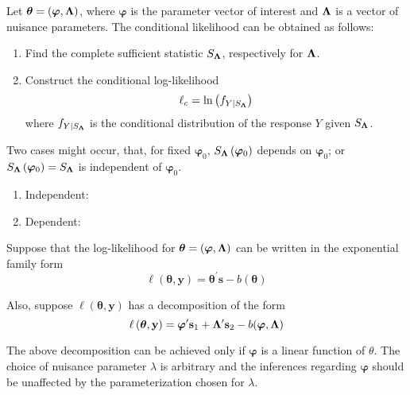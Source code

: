 Let $\boldsymbol{\theta}=(\boldsymbol{\varphi},\boldsymbol{\Lambda})$, where $\boldsymbol{\varphi}$ is the parameter vector of interest and $\boldsymbol{\Lambda}$ is a vector of nuisance parameters. The conditional likelihood can be obtained as follows:
\begin{enumerate}
	\item Find the complete sufficient statistic $S_{\boldsymbol{\Lambda}}$, respectively for $\boldsymbol{\Lambda}$.
	\item  Construct the conditional log-likelihood
	      \begin{equation}
		      \ell_{c}=\ln\left(f_{Y\mid S_{\boldsymbol{\Lambda}}}\right)
	      \end{equation}
	      where $f_{Y\mid S_{\boldsymbol{\Lambda}}}$ is the conditional distribution of the response $Y$ given $S_{\boldsymbol{\Lambda}}$.
\end{enumerate}

\begin{remark}
	Two cases might occur, that, for fixed $\boldsymbol{\varphi}_{0}$, $S_{\boldsymbol{\Lambda}}\left(\boldsymbol{\varphi}_{0}\right)$ depends on $\boldsymbol{\varphi}_{0}$; or $S_{\boldsymbol{\Lambda}}\left(\boldsymbol{\varphi}_{0}\right)=S_{\boldsymbol{\Lambda}}$ is independent of $\boldsymbol{\varphi}_{0}$.
	\begin{enumerate}
		\item Independent:
		\item Dependent:
	\end{enumerate}
\end{remark}

Suppose that the log-likelihood for $\boldsymbol{\theta}=\left(\boldsymbol{\varphi},\boldsymbol{\Lambda}\right)$ can be written in the exponential family form
\begin{equation}
	\ell\left(\boldsymbol{\theta},\mathbf{y}\right)=\boldsymbol{\theta}^{\prime}\mathbf{s}-b\left(\boldsymbol{\theta}\right)
\end{equation}

Also, suppose $\ell\left(\boldsymbol{\theta},\mathbf{y}\right)$ has a decomposition of the form
\begin{equation}
	\ell\left(\boldsymbol{\theta},\mathbf{y}\right)=\boldsymbol{\varphi}^{\prime}\mathbf{s}_{1}+\boldsymbol{\Lambda}^{\prime}\mathbf{s}_{2}-b(\boldsymbol{\varphi},\boldsymbol{\Lambda})
\end{equation}

\begin{remark}
	The above decomposition can be achieved only if $\boldsymbol{\varphi}$ is a linear function of $\theta$. The choice of nuisance parameter $\lambda$ is arbitrary and the inferences regarding $\boldsymbol{\varphi}$ should be unaffected by the parameterization chosen for $\lambda$.
\end{remark}

